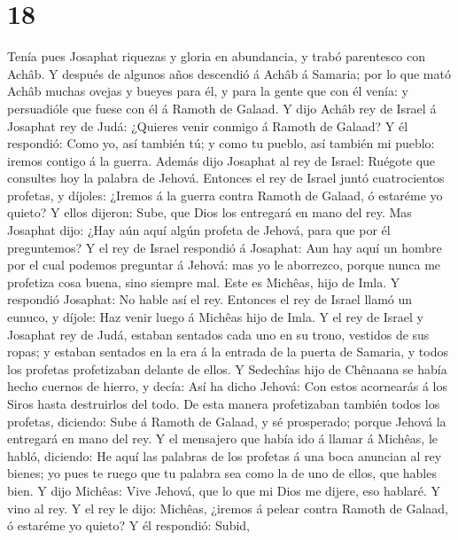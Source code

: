 \hypertarget{section-17}{%
\section{18}\label{section-17}}

 Tenía pues Josaphat riquezas y gloria en abundancia, y
trabó parentesco con Achâb.  Y después de algunos años
descendió á Achâb á Samaria; por lo que mató Achâb muchas ovejas y
bueyes para él, y para la gente que con él venía: y persuadióle que
fuese con él á Ramoth de Galaad.  Y dijo Achâb rey de
Israel á Josaphat rey de Judá: ¿Quieres venir conmigo á Ramoth de
Galaad? Y él respondió: Como yo, así también tú; y como tu pueblo, así
también mi pueblo: iremos contigo á la guerra.  Además
dijo Josaphat al rey de Israel: Ruégote que consultes hoy la palabra de
Jehová.  Entonces el rey de Israel juntó cuatrocientos
profetas, y díjoles: ¿Iremos á la guerra contra Ramoth de Galaad, ó
estaréme yo quieto? Y ellos dijeron: Sube, que Dios los entregará en
mano del rey.  Mas Josaphat dijo: ¿Hay aún aquí algún
profeta de Jehová, para que por él preguntemos?  Y el rey
de Israel respondió á Josaphat: Aun hay aquí un hombre por el cual
podemos preguntar á Jehová: mas yo le aborrezco, porque nunca me
profetiza cosa buena, sino siempre mal. Este es Michêas, hijo de Imla. Y
respondió Josaphat: No hable así el rey.  Entonces el rey
de Israel llamó un eunuco, y díjole: Haz venir luego á Michêas hijo de
Imla.  Y el rey de Israel y Josaphat rey de Judá, estaban
sentados cada uno en su trono, vestidos de sus ropas; y estaban sentados
en la era á la entrada de la puerta de Samaria, y todos los profetas
profetizaban delante de ellos.  Y Sedechîas hijo de
Chênaana se había hecho cuernos de hierro, y decía: Así ha dicho Jehová:
Con estos acornearás á los Siros hasta destruirlos del todo.
 De esta manera profetizaban también todos los profetas,
diciendo: Sube á Ramoth de Galaad, y sé prosperado; porque Jehová la
entregará en mano del rey.  Y el mensajero que había ido
á llamar á Michêas, le habló, diciendo: He aquí las palabras de los
profetas á una boca anuncian al rey bienes; yo pues te ruego que tu
palabra sea como la de uno de ellos, que hables bien.  Y
dijo Michêas: Vive Jehová, que lo que mi Dios me dijere, eso hablaré. Y
vino al rey.  Y el rey le dijo: Michêas, ¿iremos á pelear
contra Ramoth de Galaad, ó estaréme yo quieto? Y él respondió: Subid,
